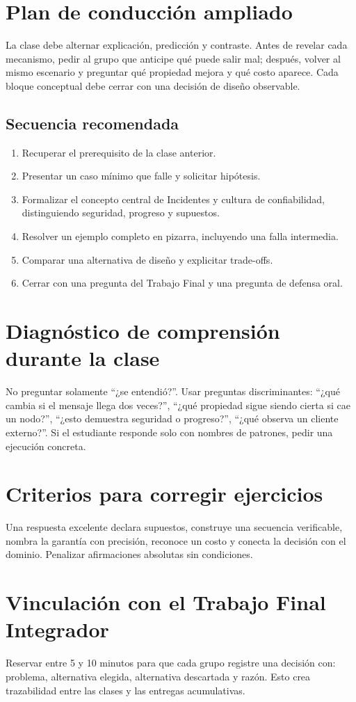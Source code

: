 \documentclass[variant=docente,cover=institutional,mode=screen]{ua-engineering-v6-article}
\begin{document}
\section{Plan de conducción ampliado}
La clase debe alternar explicación, predicción y contraste. Antes de revelar cada mecanismo, pedir al grupo que anticipe qué puede salir mal; después, volver al mismo escenario y preguntar qué propiedad mejora y qué costo aparece. Cada bloque conceptual debe cerrar con una decisión de diseño observable.
\subsection*{Secuencia recomendada}
\begin{enumerate}
\item Recuperar el prerequisito de la clase anterior.
\item Presentar un caso mínimo que falle y solicitar hipótesis.
\item Formalizar el concepto central de Incidentes y cultura de confiabilidad, distinguiendo seguridad, progreso y supuestos.
\item Resolver un ejemplo completo en pizarra, incluyendo una falla intermedia.
\item Comparar una alternativa de diseño y explicitar trade-offs.
\item Cerrar con una pregunta del Trabajo Final y una pregunta de defensa oral.
\end{enumerate}
\section{Diagnóstico de comprensión durante la clase}
No preguntar solamente ``¿se entendió?''. Usar preguntas discriminantes: ``¿qué cambia si el mensaje llega dos veces?'', ``¿qué propiedad sigue siendo cierta si cae un nodo?'', ``¿esto demuestra seguridad o progreso?'', ``¿qué observa un cliente externo?''. Si el estudiante responde solo con nombres de patrones, pedir una ejecución concreta.
\section{Criterios para corregir ejercicios}
Una respuesta excelente declara supuestos, construye una secuencia verificable, nombra la garantía con precisión, reconoce un costo y conecta la decisión con el dominio. Penalizar afirmaciones absolutas sin condiciones.
\section{Vinculación con el Trabajo Final Integrador}
Reservar entre 5 y 10 minutos para que cada grupo registre una decisión con: problema, alternativa elegida, alternativa descartada y razón. Esto crea trazabilidad entre las clases y las entregas acumulativas.
\end{document}
